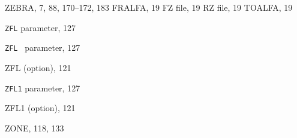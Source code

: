 \begin{theindex}
  \indexspace

  \item ZEBRA, 7, 88, 170--172, 183
    \subitem FRALFA, 19
    \subitem FZ file, 19
    \subitem RZ file, 19
    \subitem TOALFA, 19
  \item {\tt ZFL}
     parameter, 127
  \item {\tt ZFL }
     parameter, 127
  \item ZFL (option), 121
  \item {\tt ZFL1}
     parameter, 127
  \item ZFL1 (option), 121
  \item {\ttfamily  ZONE}, 118, 133

\end{theindex}
